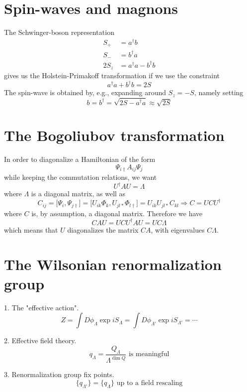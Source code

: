 \documentclass[12pt, oneside]{book}
\begin{document}
\section*{Spin-waves and magnons}
The Schwinger-boson representation
\begin{align*}
S_+&=a^{\dagger}b\\
S_-&=b^{\dagger}a\\
2S_z&=a^{\dagger}a-b^{\dagger}b
\end{align*}
gives us the Holstein-Primakoff transformation if we use the constraint
\[
a^{\dagger}a+b^{\dagger}b=2S
\]
The spin-wave is obtained by, e.g., expanding around $S_z=-S$, namely setting
\[
b=b^{\dagger}=\sqrt{2S-a^{\dagger}a}\approx\sqrt{2S}
\]

\section*{The Bogoliubov transformation}
In order to diagonalize a Hamiltonian of the form
\[
\Psi_{i\dagger}A_{ij}\Psi_j
\]
while keeping the commutation relations, we want
\[
U^{\dagger}AU=\Lambda
\]
where $\Lambda$ is a diagonal matrix, as well as
\[
C_{ij}=\big[\Psi_i,\Psi_{j\dagger}\big]=\big[U_{ik}\Phi_k,U_{jl*}\Phi_{l\dagger}\big]=U_{ik}U_{jl*}C_{kl}\Rightarrow
C=UCU^{\dagger}
\]
where $C$ is, by assumption, a diagonal matrix. Therefore we have
\[
CAU=UCU^{\dagger}AU=UC\Lambda
\]
which means that $U$ diagonalizes the matrix $CA$, with eigenvalues $C\Lambda$.

\section*{The Wilsonian renormalization group}
1. The "effective action".
\[
Z=\int D\phi_{\Lambda}\exp{iS_{\Lambda}}=\int D\phi_{\Lambda'}\exp{iS_{\Lambda'}}=\cdots
\]

2. Effective field theory.
\[
\text{$q_{\Lambda}=\frac{Q_{\Lambda}}{\Lambda^{\dim{Q}}}$ is meaningful}
\]

3. Renormalization group fix points.
\[
\text{$\big\{q_{\Lambda'}\big\}=\big\{q_{\Lambda}\big\}$ up to a field rescaling}
\]
\end{document}
